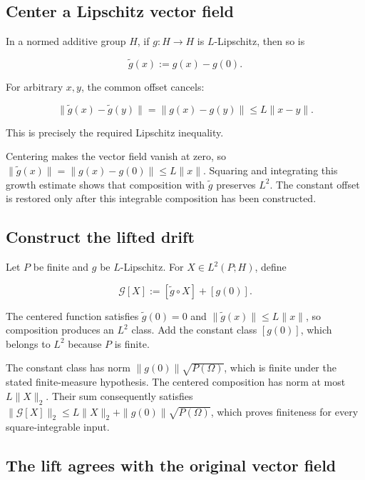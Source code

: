 \documentclass[11pt,a4paper]{article}
\begin{document}
\subsection{\texorpdfstring{Center a Lipschitz vector field}{Center a Lipschitz vector field}}


In a normed additive group \(H\), if \(g:H\to H\) is \(L\)-Lipschitz, then so is

\[\widetilde g(x):=g(x)-g(0).\]

For arbitrary \(x,y\), the common offset cancels:

\[\|\widetilde g(x)-\widetilde g(y)\|=\|g(x)-g(y)\|\le L\|x-y\|.\]

This is precisely the required Lipschitz inequality.



Centering makes the vector field vanish at zero, so \(\|\widetilde g(x)\|=\|g(x)-g(0)\|\le L\|x\|\). Squaring and integrating this growth estimate shows that composition with \(\widetilde g\) preserves \(L^2\). The constant offset is restored only after this integrable composition has been constructed.


\subsection{\texorpdfstring{Construct the lifted drift}{Construct the lifted drift}}


Let \(P\) be finite and \(g\) be \(L\)-Lipschitz. For \(X\in L^2(P;H)\), define

\[\mathcal G[X]:=[\widetilde g\circ X]+[g(0)].\]

The centered function satisfies \(\widetilde g(0)=0\) and \(\|\widetilde g(x)\|\le L\|x\|\), so composition produces an \(L^2\) class. Add the constant class \([g(0)]\), which belongs to \(L^2\) because \(P\) is finite.



The constant class has norm \(\|g(0)\|\sqrt{P(\Omega)}\), which is finite under the stated finite-measure hypothesis. The centered composition has norm at most \(L\|X\|_2\). Their sum consequently satisfies \(\|\mathcal G[X]\|_2\le L\|X\|_2+\|g(0)\|\sqrt{P(\Omega)}\), which proves finiteness for every square-integrable input.


\subsection{\texorpdfstring{The lift agrees with the original vector field}{The lift agrees with the original vector field}}
\end{document}
